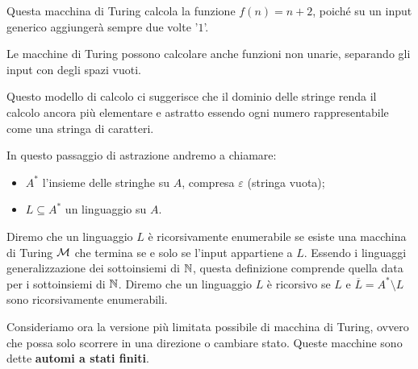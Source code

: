\begin{figure}[ht]
{
    }
\end{figure}

Questa macchina di Turing calcola la funzione \(f(n) = n+2\), poiché su un input generico aggiungerà sempre due volte '\(1\)'.

Le macchine di Turing possono calcolare anche funzioni non unarie, separando gli input con degli spazi vuoti.

Questo modello di calcolo ci suggerisce che il dominio delle stringe renda il calcolo ancora più elementare e astratto essendo ogni numero rappresentabile come una stringa di caratteri.

In questo passaggio di astrazione andremo a chiamare:
\begin{itemize}
  \item \(A^*\) l'insieme delle stringhe su \(A\), compresa \(\varepsilon\) (stringa vuota);
  \item \(L \subseteq A^*\) un linguaggio su \(A\).
\end{itemize}

Diremo che un linguaggio \(L\) è ricorsivamente enumerabile se esiste una macchina di Turing \(\mathcal{M}\) che termina se e solo se l'input appartiene a \(L\).
Essendo i linguaggi generalizzazione dei sottoinsiemi di \(\mathbb{N}\), questa definizione comprende quella data per i sottoinsiemi di \(\mathbb{N}\).
Diremo che un linguaggio \(L\) è ricorsivo se \(L\) e \(\overline{L}=A^* \setminus L\) sono ricorsivamente enumerabili.

Consideriamo ora la versione più limitata possibile di macchina di Turing, ovvero che possa solo scorrere in una direzione o cambiare stato. Queste macchine sono dette \textbf{automi a stati finiti}.

